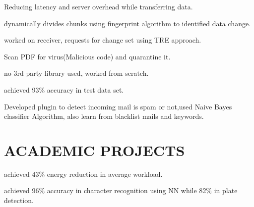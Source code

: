 \documentclass[]{deedy-resume-openfont}
\begin{document}
\begin{minipage}[t]{0.66\textwidth}
\begin{tightemize}
\item Reducing latency and server overhead while transferring data.
\item dynamically divides chunks using fingerprint algorithm to identified data change.
\item worked on receiver, requests for change set using TRE approach.
\end{tightemize}
\sectionsep

\begin{tightemize}
\item Scan PDF for virus(Malicious code) and quarantine it.
\item no 3rd party library used, worked from scratch.
\item achieved 93\% accuracy in test data set.
\end{tightemize}
\sectionsep

\begin{tightemize}
\item Developed plugin to detect incoming mail is spam or not,used Naive Bayes classifier Algorithm, also learn from blacklist mails and keywords.
\end{tightemize}
\sectionsep

\section{ACADEMIC PROJECTS}
\begin{tightemize}
\item achieved 43\% energy reduction in average workload.  
\end{tightemize}
\sectionsep

\begin{tightemize}
\item achieved 96\% accuracy in character recognition using NN while 82\% in plate detection.
\end{tightemize}
\sectionsep


\end{minipage} 
\end{document}
